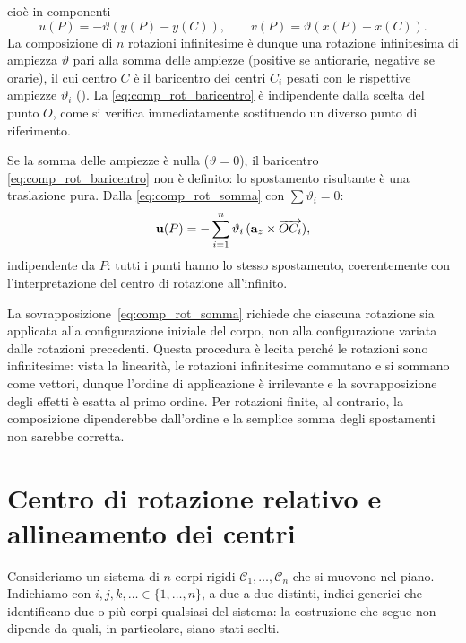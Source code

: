 cioè in componenti
\begin{equation}
u(P) = -\vartheta (y(P)- y(C)), \qquad
		v(P) = \vartheta (x(P)-x(C)).
\end{equation}
La composizione di $n$ rotazioni infinitesime è dunque una rotazione infinitesima di
ampiezza $\vartheta$ pari alla somma delle ampiezze (positive se antiorarie, negative
se orarie), il cui centro $C$ è il baricentro dei centri $C_i$ pesati con le
rispettive ampiezze $\vartheta_i$ (). La
\eqref{eq:comp_rot_baricentro} è indipendente dalla scelta del punto $O$, come si
verifica immediatamente sostituendo un diverso punto di riferimento.





Se la somma delle ampiezze è nulla ($\vartheta = 0$), il baricentro
\eqref{eq:comp_rot_baricentro} non è definito: lo spostamento risultante è una
traslazione pura. Dalla \eqref{eq:comp_rot_somma} con $\sum\vartheta_i = 0$:
\begin{equation}
	\mathbf{u}(P) = -\sum_{i=1}^{n} \vartheta_i\,
	(\mathbf{a}_z \times \overrightarrow{OC_i}),
\end{equation}
indipendente da $P$: tutti i punti hanno lo stesso spostamento, coerentemente con
l'interpretazione del centro di rotazione all'infinito.

\begin{oss}
	La sovrapposizione~\eqref{eq:comp_rot_somma} richiede che ciascuna rotazione sia
	applicata alla configurazione iniziale del corpo, non alla configurazione variata
	dalle rotazioni precedenti. Questa procedura è lecita perché le rotazioni sono
	infinitesime: vista la linearità, le rotazioni infinitesime commutano e si sommano
	come vettori, dunque l'ordine di applicazione è irrilevante e la sovrapposizione
	degli effetti è esatta al primo ordine. Per rotazioni finite, al contrario, la
	composizione dipenderebbe dall'ordine e la semplice somma degli spostamenti non
	sarebbe corretta.
\end{oss}


\section{Centro di rotazione relativo e allineamento dei centri}\label{sec:CR_relativo}

Consideriamo un sistema di $n$ corpi rigidi $\mathcal{C}_1,\ldots,\mathcal{C}_n$ che
si muovono nel piano. Indichiamo con $i,j,k,\ldots\in\{1,\ldots,n\}$, a due a
due distinti, indici generici che identificano due o più corpi qualsiasi del
sistema: la costruzione che segue non dipende da quali, in particolare, siano stati
scelti.

